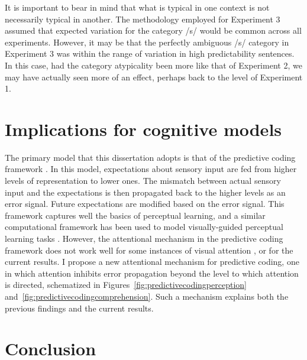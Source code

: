 It is important to bear in mind that what is typical in one context is not necessarily typical in another.  
The methodology employed for Experiment 3 assumed that expected variation for the category /s/ would be common across all experiments.  
However, it may be that the perfectly ambiguous /s/ category in Experiment 3 was within the range of variation in high predictability sentences. 
In this case, had the category atypicality been more like that of Experiment 2, we may have actually seen more of an effect, perhaps back to the level of Experiment 1.

\section{Implications for cognitive models}

The primary model that this dissertation adopts is that of the predictive coding framework \citep{Clark2013}.
In this model, expectations about sensory input are fed from higher levels of representation to lower ones.
The mismatch between actual sensory input and the expectations is then propagated back to the higher levels as an error signal.
Future expectations are modified based on the error signal.
This framework captures well the basics of perceptual learning, and a similar computational framework has been used to model visually-guided perceptual learning tasks \citep{Kleinschmidt2011}.
However, the attentional mechanism in the predictive coding framework does not work well for some instances of visual attention \citep{Block2013}, or for the current results.
I propose a new attentional mechanism for predictive coding, one in which attention inhibits error propagation beyond the level to which attention is directed, schematized in Figures~\ref{fig:predictivecodingperception} and~\ref{fig:predictivecodingcomprehension}.
Such a mechanism explains both the previous findings and the current results.

\section{Conclusion}


